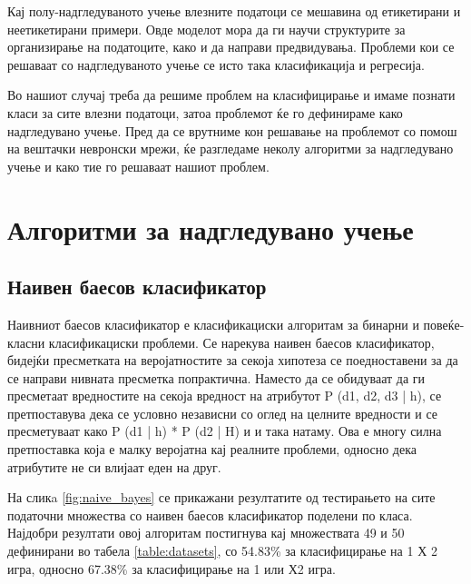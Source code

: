 Кај полу-надгледуваното учење влезните податоци се мешавина од етикетирани и неетикетирани примери.
Овде моделот мора да ги научи структурите за организирање на податоците, како и да направи предвидувања.
Проблеми кои се решаваат со надгледуваното учење се исто така класификација и регресија.

Во нашиот случај треба да решиме проблем на класифицирање и имаме познати класи за сите влезни податоци, затоа проблемот ќе го дефинираме како надгледувано учење. Пред да се врутниме кон решавање на проблемот со помош на вештачки невронски мрежи, ќе разгледаме неколу алгоритми за надгледувано учење и како тие го решаваат нашиот проблем.  
\section{Алгоритми за надгледувано учење}
\subsection{Наивен баесов класификатор}
Наивниот баесов класификатор \cite{rish2001empirical} е класификациски алгоритам за бинарни и повеќе-класни класификациски проблеми.
Се нарекува наивен баесов класификатор, бидејќи пресметката на веројатностите за секоја хипотеза се поедноставени за да се направи нивната пресметка попрактична. Наместо да се обидуваат да ги пресметаат вредностите на секоја вредност на атрибутот P (d1, d2, d3 | h), се претпоставува дека се условно независни со оглед на целните вредности и се пресметуваат како P (d1 | h) * P (d2 | H) и и така натаму.
Ова е многу силна претпоставка која е малку веројатна кај реалните проблеми, односно дека атрибутите не си влијаат еден на друг.

На сликa \ref{fig:naive_bayes} се прикажани резултатите од тестирањето на сите податочни множества со наивен баесов класификатор поделени по класа. Најдобри резултати овој алгоритам постигнува кај множествата 49 и 50 дефинирани во табела \ref{table:datasets}, со 54.83\% за класифицирање на 1 Х 2 игра, односно 67.38\% за класифицирање на 1 или Х2 игра. 

